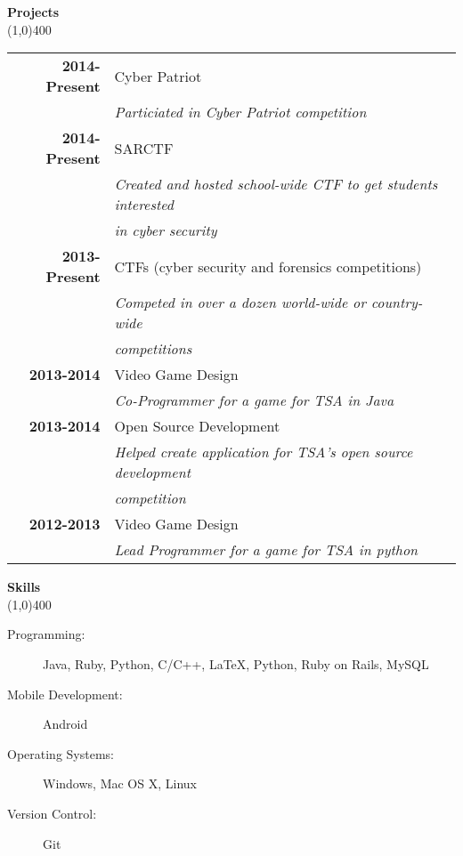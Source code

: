 \documentclass[7pt]{report}
\begin{document}
{\bf {\Large Projects}} \\
\line(1,0){400} \\
\begin{tabular}{r|l}
	{\bf 2014-Present} & Cyber Patriot \\ 
	                   & \textit{Particiated in Cyber Patriot competition}
	\vspace{0.3cm} \\
	{\bf 2014-Present} & SARCTF \\ 
										 & \textit{Created and hosted school-wide CTF to get students interested}\\&\textit{in cyber security } 
	\vspace{0.3cm} \\
	{\bf 2013-Present} & CTFs (cyber security and forensics competitions) \\ 
										 & \textit{Competed in over a dozen world-wide or country-wide} \\ &\textit{competitions } 
	\vspace{0.3cm} \\
	
	{\bf 2013-2014} & Video Game Design \\ 
	                   & \textit{Co-Programmer for a game for TSA in Java}
	\vspace{0.3cm} \\
	  {\bf 2013-2014} & Open Source Development \\ 
	                   & \textit{Helped create application for TSA's open source development} \\ & \textit{competition}
	\vspace{0.3cm} \\
	
	{\bf 2012-2013} & Video Game Design \\ 
	                   & \textit{Lead Programmer for a game for TSA in python}
\end{tabular}

{\bf {\Large Skills}} \\
\line(1,0){400} \\ 
\begin{description}
	\item[Programming:] Java, Ruby, Python, C/C++, \LaTeX, Python, Ruby on Rails, MySQL
	\item[Mobile Development:] Android
	\item[Operating Systems:] Windows, Mac OS X, Linux
	\item[Version Control:] Git
\end{description}
\end{document}
